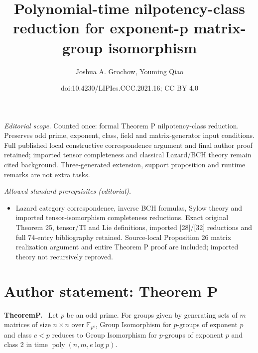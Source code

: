 \documentclass[10pt,a4paper]{article}
\title{Polynomial-time nilpotency-class reduction for exponent-p matrix-group isomorphism}
\author{Joshua A. Grochow, Youming Qiao}
\date{doi:10.4230/LIPIcs.CCC.2021.16; CC BY 4.0}
\newenvironment{authorclaim}[1]{\par\medskip\noindent\textbf{#1.}\ }{\par\medskip}
\begin{document}
\maketitle
\noindent\textit{Editorial scope.} Counted once: formal Theorem P nilpotency-class reduction. Preserves odd prime, exponent, class, field and matrix-generator input conditions. Full published local constructive correspondence argument and final author proof retained; imported tensor completeness and classical Lazard/BCH theory remain cited background. Three-generated extension, support proposition and runtime remarks are not extra tasks.\par\medskip
\noindent\textit{Allowed standard prerequisites (editorial).}\begin{itemize}
\item Lazard category correspondence, inverse BCH formulas, Sylow theory and imported tensor-isomorphism completeness reductions. Exact original Theorem 25, tensor/TI and Lie definitions, imported [28]/[32] reductions and full 74-entry bibliography retained. Source-local Proposition 26 matrix realization argument and entire Theorem P proof are included; imported theory not recursively reproved.
\end{itemize}\medskip
\section*{Author statement: Theorem P}

\begin{authorclaim}{TheoremP}
Let $p$ be an odd prime. For groups given by generating sets of $m$ matrices of size $n\times n$ over $\mathbb F_{p^e}$, Group Isomorphism for $p$-groups of exponent $p$ and class $c<p$ reduces to Group Isomorphism for $p$-groups of exponent $p$ and class 2 in time $\operatorname{poly}(n,m,e\log p)$.
\end{authorclaim}
\end{document}
